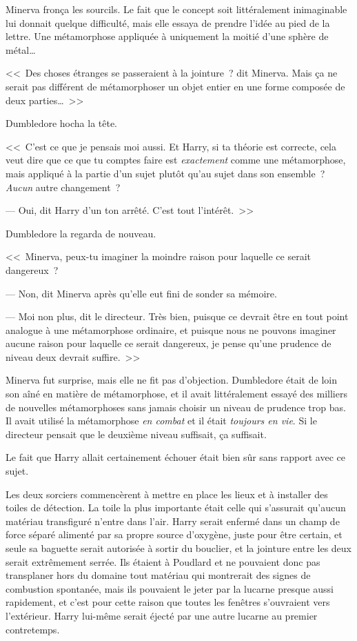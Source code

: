 Minerva fronça les sourcils. Le fait que le concept soit littéralement inimaginable lui donnait quelque difficulté, mais elle essaya de prendre l'idée au pied de la lettre. Une métamorphose appliquée à uniquement la moitié d'une sphère de métal…

<<~Des choses étranges se passeraient à la jointure~? dit Minerva. Mais ça ne serait pas différent de métamorphoser un objet entier en une forme composée de deux parties…~>>

Dumbledore hocha la tête.

<<~C'est ce que je pensais moi aussi. Et Harry, si ta théorie est correcte, cela veut dire que ce que tu comptes faire est \emph{exactement} comme une métamorphose, mais appliqué à la partie d'un sujet plutôt qu'au sujet dans son ensemble~? \emph{Aucun} autre changement~?

--- Oui, dit Harry d'un ton arrêté. C'est tout l'intérêt.~>>

Dumbledore la regarda de nouveau.

<<~Minerva, peux-tu imaginer la moindre raison pour laquelle ce serait dangereux~?

--- Non, dit Minerva après qu'elle eut fini de sonder sa mémoire.

--- Moi non plus, dit le directeur. Très bien, puisque ce devrait être en tout point analogue à une métamorphose ordinaire, et puisque nous ne pouvons imaginer aucune raison pour laquelle ce serait dangereux, je pense qu'une prudence de niveau deux devrait suffire.~>>

Minerva fut surprise, mais elle ne fit pas d'objection. Dumbledore était de loin son aîné en matière de métamorphose, et il avait littéralement essayé des milliers de nouvelles métamorphoses sans jamais choisir un niveau de prudence trop bas. Il avait utilisé la métamorphose \emph{en combat} et il était \emph{toujours en vie}. Si le directeur pensait que le deuxième niveau suffisait, ça suffisait.

Le fait que Harry allait certainement échouer était bien sûr sans rapport avec ce sujet.

Les deux sorciers commencèrent à mettre en place les lieux et à installer des toiles de détection. La toile la plus importante était celle qui s'assurait qu'aucun matériau transfiguré n'entre dans l'air. Harry serait enfermé dans un champ de force séparé alimenté par sa propre source d'oxygène, juste pour être certain, et seule sa baguette serait autorisée à sortir du bouclier, et la jointure entre les deux serait extrêmement serrée. Ils étaient à Poudlard et ne pouvaient donc pas transplaner hors du domaine tout matériau qui montrerait des signes de combustion spontanée, mais ils pouvaient le jeter par la lucarne presque aussi rapidement, et c'est pour cette raison que toutes les fenêtres s'ouvraient vers l'extérieur. Harry lui-même serait éjecté par une autre lucarne au premier contretemps.

